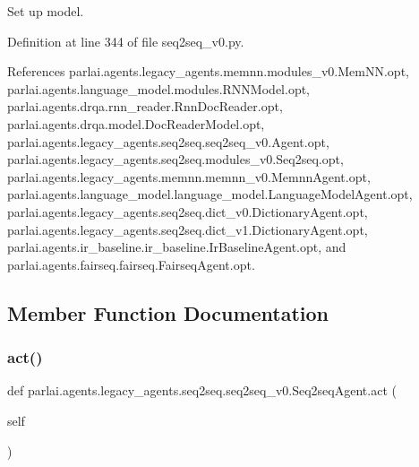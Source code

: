 \begin{DoxyVerb}Set up model.\end{DoxyVerb}
 

Definition at line 344 of file seq2seq\+\_\+v0.\+py.



References parlai.\+agents.\+legacy\+\_\+agents.\+memnn.\+modules\+\_\+v0.\+Mem\+N\+N.\+opt, parlai.\+agents.\+language\+\_\+model.\+modules.\+R\+N\+N\+Model.\+opt, parlai.\+agents.\+drqa.\+rnn\+\_\+reader.\+Rnn\+Doc\+Reader.\+opt, parlai.\+agents.\+drqa.\+model.\+Doc\+Reader\+Model.\+opt, parlai.\+agents.\+legacy\+\_\+agents.\+seq2seq.\+seq2seq\+\_\+v0.\+Agent.\+opt, parlai.\+agents.\+legacy\+\_\+agents.\+seq2seq.\+modules\+\_\+v0.\+Seq2seq.\+opt, parlai.\+agents.\+legacy\+\_\+agents.\+memnn.\+memnn\+\_\+v0.\+Memnn\+Agent.\+opt, parlai.\+agents.\+language\+\_\+model.\+language\+\_\+model.\+Language\+Model\+Agent.\+opt, parlai.\+agents.\+legacy\+\_\+agents.\+seq2seq.\+dict\+\_\+v0.\+Dictionary\+Agent.\+opt, parlai.\+agents.\+legacy\+\_\+agents.\+seq2seq.\+dict\+\_\+v1.\+Dictionary\+Agent.\+opt, parlai.\+agents.\+ir\+\_\+baseline.\+ir\+\_\+baseline.\+Ir\+Baseline\+Agent.\+opt, and parlai.\+agents.\+fairseq.\+fairseq.\+Fairseq\+Agent.\+opt.



\subsection{Member Function Documentation}
\mbox{\label{classparlai_1_1agents_1_1legacy__agents_1_1seq2seq_1_1seq2seq__v0_1_1Seq2seqAgent_ae66e8065addb136eb82828ccbe56c5ca}} 
\subsubsection{\texorpdfstring{act()}{act()}}
{\footnotesize\ttfamily def parlai.\+agents.\+legacy\+\_\+agents.\+seq2seq.\+seq2seq\+\_\+v0.\+Seq2seq\+Agent.\+act (\begin{DoxyParamCaption}\item[{}]{self }\end{DoxyParamCaption})}



